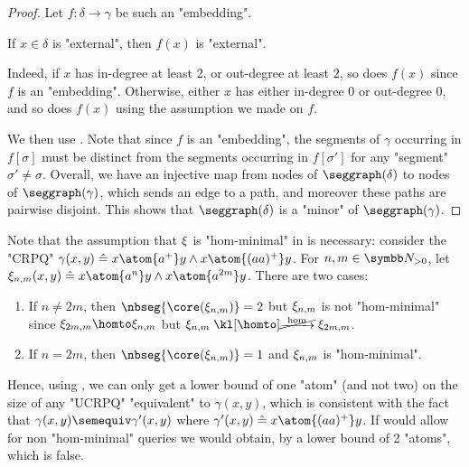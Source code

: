 \begin{proof}
	Let $f\colon \delta \to \gamma$ be such an "embedding".
	\begin{claim}
		\AP\label{claim:hom-preserves-non-internality}
		If $x \in \delta$ is "external", then $f(x)$ is "external".
	\end{claim}
	Indeed, if $x$ has in-degree at least 2, or out-degree at least 2,
	so does $f(x)$ since $f$ is an "embedding".
	Otherwise, either $x$ has either in-degree 0 or out-degree 0,
	and so does $f(x)$ using the assumption we made on $f$.

	We then use .
	Note that since $f$ is an "embedding", the segments of $\gamma$ occurring in
	$f[\sigma]$ must be distinct from the segments occurring in $f[\sigma']$
	for any "segment" $\sigma' \neq \sigma$.
	Overall, we have an injective map from nodes of $\seggraph(\delta)$ 
	to nodes of $\seggraph(\gamma)$, which sends an edge to a path,
	and moreover these paths are pairwise disjoint.
	This shows that $\seggraph(\delta)$ is a "minor" of $\seggraph(\gamma)$.
\end{proof}

\begin{remark}
	\AP\label{rk:structure-theorem}
	Note that the assumption that $\xi$ is "hom-minimal" in
	 is necessary: consider the "CRPQ"
	$\gamma(x,y) \defeq x \atom{a^+} y \land x \atom{(aa)^+} y$.
	For $n,m \in \Np$, let $\anexpansion_{n,m}(x,y) \defeq x \atom{a^n} y \land x \atom{a^{2m}} y$.
	There are two cases:
	\begin{enumerate}
		\item \AP\label{rk:structure-theorem:1} If $n \neq 2m$, then $\nbseg{\core(\anexpansion_{n,m})} = 2$
			but $\xi_{n,m}$ is not "hom-minimal" since $\anexpansion_{2m,m} \homto \anexpansion_{n,m}$ but $\anexpansion_{n,m} \nothomto \anexpansion_{2m,m}$.
		\item If $n = 2m$, then $\nbseg{\core(\anexpansion_{n,m})} = 1$
		and $\xi_{n,m}$ is "hom-minimal".
	\end{enumerate}
	Hence, using , we can only get a lower bound of
	one "atom" (and not two) on the size of any "UCRPQ" "equivalent" to $\gamma(x,y)$,
	which is consistent with the fact that $\gamma(x,y) \semequiv \gamma'(x,y)$
	where $\gamma'(x,y) \defeq x \atom{(aa)^+} y$.
	If  would allow for non "hom-minimal" queries we would obtain, by  a lower bound of 2 "atoms", which is false.
\end{remark}

